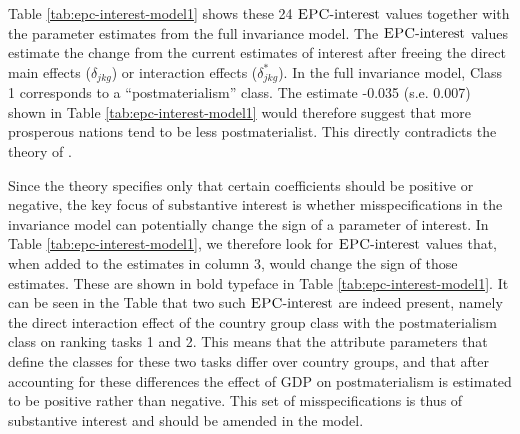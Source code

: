\documentclass[letterpaper,12pt]{article}
\newcommand{\da}{\textrm{{\sc {EPC}}-interest}}
\begin{document}
Table \ref{tab:epc-interest-model1} shows these 24 $\da{}$ values together with the parameter estimates from the full invariance model. The $\da{}$ values estimate the change from the current estimates of interest after freeing the direct main effects ($\delta_{jkg}$) or interaction effects ($\delta^*_{jkg}$). In the full invariance model, Class 1 corresponds to a ``postmaterialism'' class. The estimate -0.035 (s.e. 0.007) shown in Table \ref{tab:epc-interest-model1} would therefore suggest that more prosperous nations tend to be less postmaterialist. This directly contradicts the theory of \citet{inglehart2010changing}.

Since the theory specifies only that certain coefficients should be positive or negative, the key focus of substantive interest is whether misspecifications in the invariance model can potentially change the sign of a parameter of interest. In Table \ref{tab:epc-interest-model1}, we therefore look for $\da{}$ values that, when added to the estimates in column 3, would change the sign of those estimates. These are shown in bold typeface in Table \ref{tab:epc-interest-model1}. It can be seen in the Table that two such $\da{}$ are indeed present, namely the direct interaction effect of the country group class with the postmaterialism class on ranking tasks 1 and 2.  This means that the attribute parameters that define the classes for these two tasks differ over country groups, and that after accounting for these differences the effect of GDP on postmaterialism is estimated to be positive rather than negative. This set of misspecifications is thus of substantive interest and should be amended in the model. 
\end{document}
